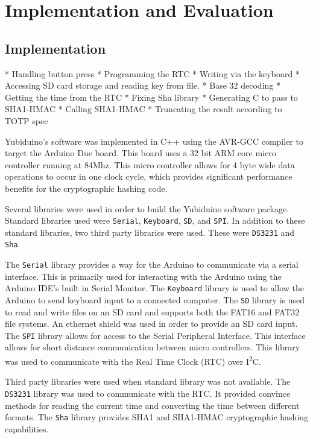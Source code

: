 \documentclass[conference]{IEEEtran}
\begin{document}
\section{Implementation and Evaluation}

\subsection{Implementation}

* Handling button press
* Programming the RTC
* Writing via the keyboard
* Accessing SD card storage and reading key from file.
* Base 32 decoding
* Getting the time from the RTC
* Fixing Sha library
* Generating C to pass to SHA1-HMAC
* Calling SHA1-HMAC
* Truncating the result according to TOTP spec

Yubiduino's software was implemented in C++ using the AVR-GCC compiler to
target the Arduino Due board.  This board uses a 32 bit ARM core micro
controller running at 84Mhz.  This micro controller allows for 4 byte wide data
operations to occur in one clock cycle, which provides significant performance
benefits for the cryptographic hashing code.

Several libraries were used in order to build the Yubiduino software package.
Standard libraries used were \texttt{Serial}, \texttt{Keyboard}, \texttt{SD},
and \texttt{SPI}.  In addition to these standard libraries, two third party
libraries were used.  These were \texttt{DS3231} and \texttt{Sha}.

The \texttt{Serial} library provides a way for the Arduino to communicate via a
serial interface.  This is primarily used for interacting with the Arduino
using the Arduino IDE's built in Serial Monitor. The \texttt{Keyboard} library
is used to allow the Arduino to send keyboard input to a connected computer.
The \texttt{SD} library is used to read and write files on an SD card and
supports both the FAT16 and FAT32 file systems.  An ethernet shield was used in
order to provide an SD card input. The \texttt{SPI} library allows for access
to the Serial Peripheral Interface.  This interface allows for short distance
communication between micro controllers.  This library was used to communicate
with the Real Time Clock (RTC) over I\textsuperscript{2}C.

Third party libraries were used when standard library was not available.  The
\texttt{DS3231} library was used to communicate with the RTC.  It provided
convince methods for reading the current time and converting the time between
different formats.  The \texttt{Sha} library provides SHA1 and SHA1-HMAC
cryptographic hashing capabilities.
\end{document}

